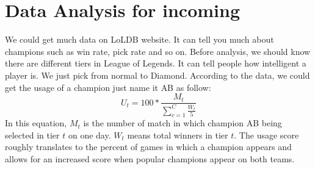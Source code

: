 \documentclass[sigconf]{acmart}
\begin{document}
\section{Data Analysis for incoming}
We could get much data on LoLDB website. It can tell you much about champions such as win rate, pick rate and so on. Before analysis, we should know there are different tiers in League of Legends. It can tell people how intelligent a player is. We just pick from normal to Diamond. According to the data, we could get the usage of a champion just name it AB as follow:\\
\begin{equation}
    U_t=100*\frac{M_t}{\sum_{c=1}^C\frac{W_t}{5}}
\end{equation}
In this equation, $M_t$ is the number of match in which champion AB being selected in tier $t$ on one day. $W_t$ means total winners in tier $t$. \cite{ccc} The usage score roughly translates to the percent of games in which a champion appears and allows for an increased score when popular champions appear on both teams.\cite{ddd} \\
\end{document}
